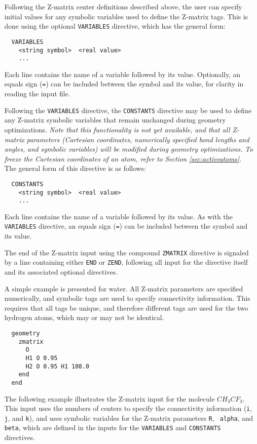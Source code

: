 Following the Z-matrix center definitions described above, the user can
 specify initial values for any symbolic variables used to define the
Z-matrix tags.  This is done using the optional  \verb+VARIABLES+ directive,
which has the general form:

\begin{verbatim}
  VARIABLES
    <string symbol>  <real value>
    ...
\end{verbatim}
Each line contains the name of a variable followed by its value.
Optionally, an equals sign (\verb+=+) can be included between the
symbol and its value, for clarity in reading the input file.

Following the \verb+VARIABLES+ directive, the \verb+CONSTANTS+
directive may be used to define any Z-matrix symbolic variables that remain
unchanged during geometry optimizations.  {\em Note that this
  functionality is not yet available, and that all Z-matrix parameters
  (Cartesian coordinates, numerically specified bond lengths and
  angles, and symbolic variables) will be modified during geometry
  optimizations. To freeze the Cartesian coordinates of an atom, refer
to Section \ref{sec:activeatoms}}.  The general form of this directive
is as follows:
\begin{verbatim}
  CONSTANTS
    <string symbol>  <real value>
    ...
\end{verbatim}
Each line contains the name of a variable followed by its value.  As
with the \verb+VARIABLES+ directive, an equals sign (\verb+=+) can be
included between the symbol and its value.

The end of the Z-matrix input using the compound \verb+ZMATRIX+
directive is signaled by a line containing either \verb+END+ or
\verb+ZEND+, following all input for the directive itself and its
associated optional directives.  

A simple example is presented for water.  All Z-matrix parameters are
specified numerically, and symbolic tags are used to specify
connectivity information.  This requires that all tags be unique, and
therefore different tags are used for the two hydrogen atoms, which may 
or may not be identical.  
\begin{verbatim}
  geometry
    zmatrix 
      O
      H1 O 0.95
      H2 O 0.95 H1 108.0
    end
  end
\end{verbatim}

The following example illustrates the Z-matrix input for the molecule
$CH_3CF_3$.  This input uses the numbers of centers to specify
the connectivity information (\verb+i+, \verb+j+, and \verb+k+), and
uses symbolic variables for the Z-matrix parameters {\tt R}, {\tt
  alpha}, and {\tt beta}, which are defined in the inputs for the
\verb+VARIABLES+ and
\verb+CONSTANTS+ directives.

